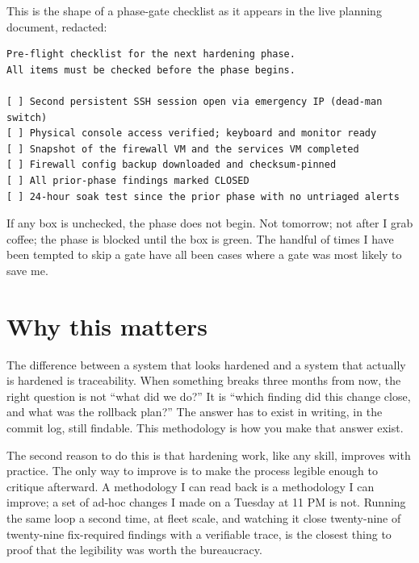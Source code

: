 \documentclass[12pt]{article}
\begin{document}
This is the shape of a phase-gate checklist as it appears in the live planning document, redacted:

\begin{verbatim}
Pre-flight checklist for the next hardening phase.
All items must be checked before the phase begins.

[ ] Second persistent SSH session open via emergency IP (dead-man switch)
[ ] Physical console access verified; keyboard and monitor ready
[ ] Snapshot of the firewall VM and the services VM completed
[ ] Firewall config backup downloaded and checksum-pinned
[ ] All prior-phase findings marked CLOSED
[ ] 24-hour soak test since the prior phase with no untriaged alerts
\end{verbatim}

If any box is unchecked, the phase does not begin. Not tomorrow; not after I grab coffee; the phase is blocked until the box is green. The handful of times I have been tempted to skip a gate have all been cases where a gate was most likely to save me.

\section{Why this matters}

The difference between a system that looks hardened and a system that actually is hardened is traceability. When something breaks three months from now, the right question is not ``what did we do?'' It is ``which finding did this change close, and what was the rollback plan?'' The answer has to exist in writing, in the commit log, still findable. This methodology is how you make that answer exist.

The second reason to do this is that hardening work, like any skill, improves with practice. The only way to improve is to make the process legible enough to critique afterward. A methodology I can read back is a methodology I can improve; a set of ad-hoc changes I made on a Tuesday at 11 PM is not. Running the same loop a second time, at fleet scale, and watching it close twenty-nine of twenty-nine fix-required findings with a verifiable trace, is the closest thing to proof that the legibility was worth the bureaucracy.
\end{document}
